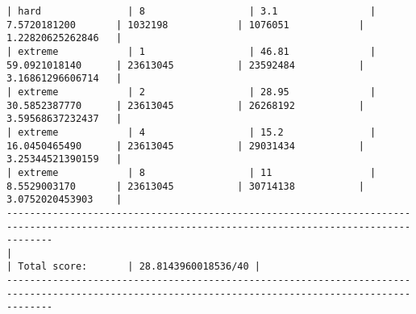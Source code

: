 \documentclass[letterpaper,11pt]{exam}
\begin{document}
\begin{questions}
\begin{lstlisting}[basicstyle=\tiny\ttfamily]
| hard               | 8                  | 3.1                | 7.5720181200       | 1032198            | 1076051            | 1.22820625262846   |
| extreme            | 1                  | 46.81              | 59.0921018140      | 23613045           | 23592484           | 3.16861296606714   |
| extreme            | 2                  | 28.95              | 30.5852387770      | 23613045           | 26268192           | 3.59568637232437   |
| extreme            | 4                  | 15.2               | 16.0450465490      | 23613045           | 29031434           | 3.25344521390159   |
| extreme            | 8                  | 11                 | 8.5529003170       | 23613045           | 30714138           | 3.0752020453903    |
----------------------------------------------------------------------------------------------------------------------------------------------------
|                                                                                                       | Total score:       | 28.8143960018536/40 |
----------------------------------------------------------------------------------------------------------------------------------------------------
    \end{lstlisting}
\end{questions}
\end{document}
